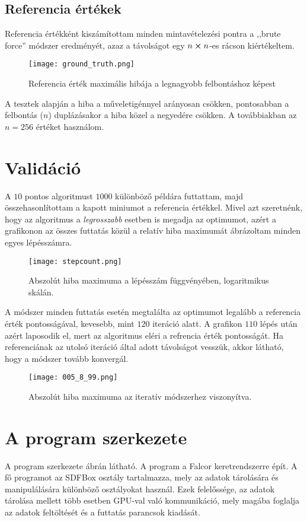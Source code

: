 \subsection{Referencia értékek}
Referencia értékként kiszámítottam minden mintavételezési pontra a ,,brute force'' módszer eredményét, azaz a távolságot egy $n\cross n$-es rácson kiértékeltem.
\begin{figure}[H]
	\centering
	\texttt{[image: ground\_truth.png]}
	\caption{Referencia érték maximális hibája a legnagyobb felbontáshoz képest}
\end{figure}
A tesztek alapján a hiba a műveletigénnyel arányosan csökken, pontosabban a felbontás ($n$) duplázásakor a hiba közel a negyedére csökken. A továbbiakban az $n=256$ értéket használom.



\section{Validáció}

A $10$ pontos algoritmust $1000$ különböző példára futtattam, majd összehasonlítottam a kapott miniumot a referencia értékkel. Mivel azt szeretnénk, hogy az algoritmus a \emph{legrosszabb} esetben is megadja az optimumot, azért a grafikonon az összes futtatás közül a relatív hiba maximumát ábrázoltam minden egyes lépésszámra.
\begin{figure}[H]
	\centering
	\texttt{[image: stepcount.png]}
	\caption{Abszolút hiba maximuma a lépésszám függvényében, logaritmikus skálán.}
\end{figure}
A módszer minden futtatás esetén megtalálta az optimumot legalább a referencia érték pontosságával, kevesebb, mint $120$ iteráció alatt. A grafikon $110$ lépés után azért laposodik el, mert az algoritmus eléri a refrencia érték pontosságát. Ha referenciának az utolsó iteráció által adott távolságot vesszük, akkor látható, hogy a módszer tovább konvergál.
\begin{figure}[H]
	\centering
	\texttt{[image: 005\_8\_99.png]}
	\caption{Abszolút hiba maximuma az iteratív módszerhez viszonyítva.}
\end{figure}


\section{A program szerkezete}
A program szerkezete  ábrán látható. A program a Falcor keretrendszerre épít. A fő programot az SDFBox osztály tartalmazza, mely az adatok tárolására és manipulálására különböző osztályokat használ. Ezek felelőssége, az adatok tárolása mellett több esetben GPU-val való kommunikáció, mely magába foglalja az adatok feltöltését és a futtatás parancsok kiadását.

